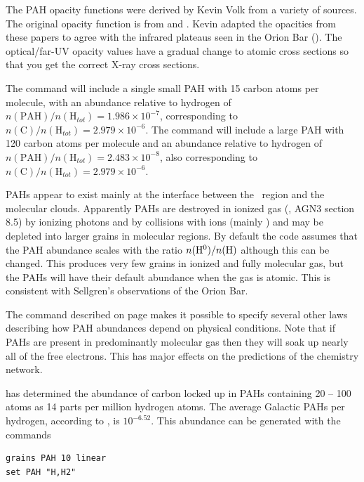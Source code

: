 The PAH opacity functions were derived by Kevin Volk
from a variety of sources.
The original opacity function is from \citet{Desert1990} and
\citet{Schutte1993}.
Kevin adapted the
opacities from these papers to agree with the infrared plateaus seen in
the Orion Bar (\citealp{Bregman1989}).
The optical/far-UV opacity values
have a gradual change to atomic cross sections so that you get the correct
X-ray cross sections.

The command  will include a
single small PAH with 15 carbon
atoms per molecule, with an abundance relative to hydrogen of
$n(
{{\mathrm{PAH}}})/n( {{\mathrm{H}}_{tot} } ) = 1.986 \times 10^{
- 7} $,
corresponding to
$n( {\mathrm{C}})/n( {{\mathrm{H}}_{tot}
} ) = 2.979 \times 10^{ - 6} $.
The command  will include
a large PAH with 120 carbon
atoms per molecule and an abundance relative to hydrogen of
$n(
{{\mathrm{PAH}}} )/n( {{\mathrm{H}}_{tot} } ) = 2.483 \times 10^{
- 8} $, also corresponding to $n( {\mathrm{C}} )/n( {{\mathrm{H}}_{tot}
} ) = 2.979 \times 10^{ - 6} $.

PAHs appear to exist mainly at the interface between
the \hplus\ region and the molecular clouds.
Apparently PAHs are destroyed in ionized gas (\citealp{Sellgren1990},
AGN3 section 8.5) by ionizing photons and by collisions with
ions (mainly \hplus) and may be depleted into larger grains in
molecular regions.
By default the code assumes that the PAH abundance scales with the ratio
$n( {\mbox{{\rm H}$^0$} })/n( {\mathrm{H}} )$ although this can be changed.
This produces very few grains in ionized and fully molecular gas,
but the PAHs will have their default abundance when the gas is atomic.
This is consistent with Sellgren's observations of the Orion Bar.

The  command
described on page \pageref{sec:CommandSetPahOption}
makes it possible to specify several other laws describing
how PAH abundances depend on physical conditions.
Note that if PAHs are present in predominantly molecular gas
then they will soak up nearly all of the free electrons.
This has major effects on the predictions of the chemistry network.

\citet{2008ARA&A..46..289T} has determined the abundance of carbon
locked up in PAHs containing 20 -- 100 atoms as 14 parts
per million hydrogen atoms.  
The average Galactic PAHs per hydrogen, according to \citet{2008ARA&A..46..289T}, 
is $10^{-6.52}$.  
This abundance can be generated with the  commands
\begin{verbatim}
grains PAH 10 linear
set PAH "H,H2"
\end{verbatim}

